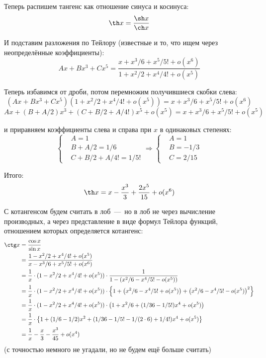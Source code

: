 \documentclass[a4paper,12pt]{article}
\begin{document}
\begin{solution}
    Теперь распишем тангенс как отношение синуса и косинуса:
    \[
      \th x = \frac{\sh x}{\ch x}
    \]

    И подставим разложения по Тейлору (известные и то, что ищем через неопределённые коэффициенты):
    \[
      A x + B x^3 + C x^5 = \frac{x + x^3/6 + x^5/5! + o(x^6)}{1 + x^2/2 + x^4/4! + o(x^5)}
    \]

    Теперь избавимся от дроби, потом перемножим получившиеся скобки слева:
    \[
      (A x + B x^3 + C x^5)(1 + x^2/2 + x^4/4! + o(x^5)) = x + x^3/6 + x^5/5! + o(x^6)
    \]
    \[
      A x + (B + A/2) x^3 + (C + B/2 + A/4!) x^5 + o(x^5) = x + x^3/6 + x^5/5! + o(x^5)
    \]

    и приравняем коэффициенты слева и справа при $x$ в одинаковых степенях:
    \[
      \left\{
        \begin{aligned}
          &A = 1\\
          &B + A/2 = 1/6\\
          &C + B/2 + A/4! = 1/5!
        \end{aligned}
      \right. \Rightarrow \left\{
        \begin{aligned}
          &A = 1\\
          &B = -1/3\\
          &C = 2/15
        \end{aligned}
      \right.
    \]

    Итого:
    \[
      \th x = x - \frac{x^3}{3} + \frac{2 x^5}{15} + o(x^6)
    \]

    \medskip

    С котангенсом будем считать в лоб~---~но в лоб не через вычисление производных, а через представление в виде формул Тейлора функций, отношением которых определяется котангенс:
    \begin{equation*}
    \begin{split}
      \ctg x &= \frac{\cos x}{\sin x}\\
        &= \frac{1 - x^2/2 + x^4/4! + o(x^5)}{x - x^3/6 + x^5/5! + o(x^6)}\\
        &= \frac{1}{x} \cdot (1 - x^2/2 + x^4/4! + o(x^5)) \cdot \frac{1}{1 - \left(x^2/6 - x^4/5! - o(x^5)\right)}\\
        &= \frac{1}{x} \cdot (1 - x^2/2 + x^4/4! + o(x^5)) \cdot \left\{1 + \left(x^2/6 - x^4/5! + o(x^5)\right) + \left(x^2/6 - x^4/5! - o(x^5)\right)^2\right\}\\
        &= \frac{1}{x} \cdot (1 - x^2/2 + x^4/4! + o(x^5)) \cdot \left(1 + x^2/6 + (1/36 - 1/5!) x^4 + o(x^5)\right)\\
        &= \frac{1}{x} \cdot \left\{1 + (1/6 - 1/2) x^2 + (1/36 - 1/5! - 1/(2 \cdot 6) + 1/4!) x^4 + o(x^5)\right\}\\
        &= \frac{1}{x} - \frac{x}{3} - \frac{x^3}{45} + o(x^4) 
    \end{split}
    \end{equation*}
    (с точностью немного не угадали, но не будем ещё больше считать)


\end{solution}
\end{document}
